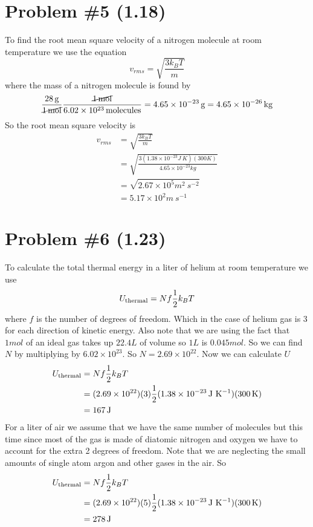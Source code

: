 \documentclass[11pt]{article}
\numberwithin{equation}{section}
\begin{document}
\section{Problem \#5 (1.18)}
To find the root mean square velocity of a nitrogen molecule at room temperature we use the equation
$$v_{rms} = \sqrt{\frac{3k_BT}{m}}$$
where the mass of a nitrogen molecule is found by
$$\frac{28\, \mathrm{g}}{\cancel{1\, \mathrm{mol}}}\frac{\cancel{1\, \mathrm{mol}}}{6.02\times10^{23}\, \mathrm{molecules}} = 4.65\times10^{-23}\, \mathrm{g} = 4.65\times10^{-26}\, \mathrm{kg}$$
So the root mean square velocity is
\begin{align*}
v_{rms} &= \sqrt{\frac{3k_BT}{m}}\\
&= \sqrt{\frac{3(1.38\times10^{-23}\unit{J\ K})(300\unit{K})}{4.65\times10^{-23}\unit{kg}}}\\
&= \sqrt{2.67\times10^{5}\unit{m^2\ s^{-2}}}\\
&= 5.17\times10^{2}\unit{m\ s^{-1}}
\end{align*}

\section{Problem \#6 (1.23)}
To calculate the total thermal energy in a liter of helium at room temperature we use 
$$U_{\textnormal{thermal}} = Nf\frac{1}{2}k_BT$$
where $f$ is the number of degrees of freedom. Which in the case of helium gas is 3 for each direction of kinetic energy. Also note that we are using the fact that $1\unit{mol}$ of an ideal gas takes up $22.4\unit{L}$ of volume so $1\unit{L}$ is $0.045\unit{mol}$. So we can find $N$ by multiplying by $6.02\times10^{23}$. So $N=2.69\times10^{22}$. Now we can calculate $U$ 
\begin{align*}
U_{\textnormal{thermal}} &= Nf\frac{1}{2}k_BT\\
&= (2.69\times10^{22})(3)\frac{1}{2}(1.38\times10^{-23}\unit{J\ K^{-1}})(300\unit{K})\\
&= 167\unit{J}
\end{align*}
For a liter of air we assume that we have the same number of molecules but this time since most of the gas is made of diatomic nitrogen and oxygen we have to account for the extra 2 degrees of freedom. Note that we are neglecting the small amounts of single atom argon and other gases in the air. So 
\begin{align*}
U_{\textnormal{thermal}} &= Nf\frac{1}{2}k_BT\\
&= (2.69\times10^{22})(5)\frac{1}{2}(1.38\times10^{-23}\unit{J\ K^{-1}})(300\unit{K})\\
&= 278\unit{J}
\end{align*}
\end{document}
